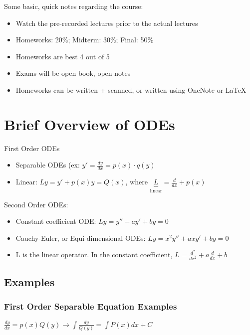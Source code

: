 \graphicspath{{./Lecture1/}}
Some basic, quick notes regarding the course:

\begin{itemize}
    \item Watch the pre-recorded lectures prior to the actual lectures
    \item Homeworks: 20\%; Midterm: 30\%; Final: 50\%
    \item Homeworks are best 4 out of 5
    \item Exams will be open book, open notes
    \item Homeworks can be written + scanned, or written using OneNote or \LaTeX
\end{itemize}

\section{Brief Overview of ODEs}

First Order ODEs

\begin{itemize}
    \item Separable ODEs (ex: $y' = \frac{dy}{dx} = p(x) \cdot q(y)$
    \item Linear: $Ly = y' + p(x) y = Q(x)$, where $\underbrace{L}_{\text{linear}} = \frac{d}{dx} + p(x)$
\end{itemize}

Second Order ODEs:

\begin{itemize}
    \item Constant coefficient ODE: $Ly = y'' + a y' + by = 0$
    \item Cauchy-Euler, or Equi-dimensional ODEs: $Ly = x^2 y'' + a x y' + by = 0$
    \item L is the linear operator. In the constant coefficient, $L = \frac{d^2}{dx^2} + a \frac{d}{dx} + b$ 
\end{itemize}

\subsection{Examples}
\subsubsection{First Order Separable Equation Examples}

$\frac{dy}{dx} = p(x) Q(y) \longrightarrow \int{\frac{dy}{Q(y)}} = \int{P(x) dx + C}$

